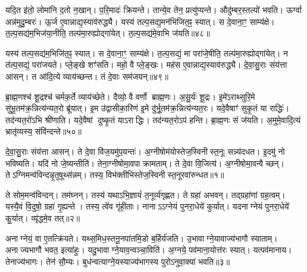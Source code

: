 यदि॒त इ॑तो॒ लोमा॑नि द॒तो न॒खान्।
प॒रि॒मादः॑ क्रियन्ते।
तान्ये॒व तेन॒ प्रत्यु॑प्यन्ते।
औदु॑म्बर॒स्तल्पो॑ भवति।
ऊर्ग्वा अन्न॑मुदु॒म्बरः॑।
ऊ॒र्ज ए॒वान्नाद्य॒स्याव॑रुद्ध्यै।
यस्य॑ तल्प॒सद्य॒मन॑भिजित॒ꣴ॒ स्यात्।
स दे॒वाना॒ꣳ॒ साम्य॑क्षे।
त॒ल्प॒सद्य॑म॒भिज॑या॒नीति॒ तल्प॑मा॒रुह्योद्गा॑येत्।
त॒ल्प॒सद्य॑मे॒वाभि ज॑यति॥४८॥

यस्य॑ तल्प॒सद्य॑म॒भिजि॑त॒ꣴ॒ स्यात्।
स दे॒वाना॒ꣳ॒ साम्य॑क्षे।
त॒ल्प॒सद्यं॒ मा परा॑जे॒षीति॒ तल्प॑मा॒रुह्योद्गा॑येत्।
न त॑ल्प॒सद्यं॒ परा॑जयते।
प्ले॒ङ्खे शꣳ॑सति।
महो॒ वै प्ले॒ङ्खः।
मह॑स ए॒वान्नाद्य॒स्याव॑रुद्ध्यै।
दे॒वा॒सु॒राः संय॑त्ता आसन्।
त आ॑दि॒त्ये व्याय॑च्छन्त।
तं दे॒वाः सम॑जयन्॥४९॥

ब्रा॒ह्म॒णश्च॑ शू॒द्रश्च॑ चर्मक॒र्ते व्याय॑च्छेते।
दैव्यो॒ वै वर्णो ब्राह्म॒णः।
अ॒सु॒र्यः॑ शू॒द्रः।
इ॒मे॑\-ऽराथ्सुरि॒मे सु॑भू॒तम॑क्र॒न्नित्य॑न्यत॒रो ब्रू॑यात्।
इ॒म उ॑द्वासीका॒रिण॑ इ॒मे दु॑र्भू॒तम॑क्र॒न्नित्य॑न्यत॒रः।
यदे॒वैषाꣳ॑ सुकृ॒तं या राद्धिः॑।
तद॑न्यत॒रो॑ऽभि श्री॑णाति।
यदे॒वैषां दुष्कृ॒तं याऽराद्धिः।
तद॑न्यत॒रोऽप॑ हन्ति।
ब्रा॒ह्म॒णः सं ज॑यति।
अ॒मुमे॒वादि॒त्यं भ्रातृ॑व्यस्य॒ संवि॑न्दन्ते॥५०॥




\clearpage
{}
\setcounter{anuvakam}{0}

दे॒वा॒सु॒राः संय॑त्ता आसन्।
ते दे॒वा वि॑ज॒यमु॑प॒यन्तः॑।
अ॒ग्नीषोम॑योस्तेज॒स्विनीस्त॒नूः सन्न्य॑दधत।
इ॒दमु॑ नो भविष्यति।
यदि॑ नो जे॒ष्यन्तीति॑।
तेना॒ग्नीषोमा॒वपाक्रामताम्।
ते दे॒वा वि॒जित्य॑।
अ॒ग्नीषोमा॒वन्वैच्छन्।
तेऽग्निमन्व॑\-विन्दन्नृ॒तुषूथ्स॑न्नम्।
तस्य॒ विभ॑क्तीभिस्तेज॒स्विनीस्त॒नू\-रवा॑रुन्धत॥१॥

ते सोम॒मन्व॑विन्दन्।
तम॑घ्नन्।
तस्य॑ यथा\-ऽभि॒ज्ञायं॑ त॒नूर्व्य॑गृह्णत।
ते ग्रहा॑ अभवन्।
तद्ग्रहा॑णां ग्रह॒त्वम्।
यस्यै॒वं वि॒दुषो॒ ग्रहा॑ गृ॒ह्यन्ते।
तस्य॒ त्वे॑व गृ॑ही॒ताः।
नाना\-ऽऽग्नेयं पुनरा॒धेये॑ कुर्यात्।
यदनाग्नेयं पुनरा॒धेये॑ कु॒र्यात्।
व्यृ॑द्धमे॒व तत्॥२॥

अनाग्नेयं॒ वा ए॒तत्क्रि॑यते।
यथ्स॒मिध॒स्तनू॒नपा॑तमि॒डो ब॒र्\mbox{}हिर्य॑जति।
उ॒भावाग्ने॒यावाज्य॑भागौ स्याताम्।
अनाज्यभागौ भवत॒ इत्या॑हुः।
यदु॒भावाग्ने॒याव॒न्वञ्चा॒विति॑।
अ॒ग्नये॒ पव॑माना॒योत्त॑रः स्यात्।
यत्पव॑मानाय।
तेनाज्य॑भागः।
तेन॑ सौ॒म्यः।
बुध॑न्वत्याग्ने॒यस्याज्य॑भागस्य पुरो\-ऽनुवा॒क्या॑ भवति॥३॥

